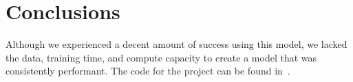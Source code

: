\section{Conclusions}
Although we experienced a decent amount of success using this model, we lacked the data, training time, and compute capacity to create a model that was consistently performant.
The code for the project can be found in~\cite{FruitFly}.

